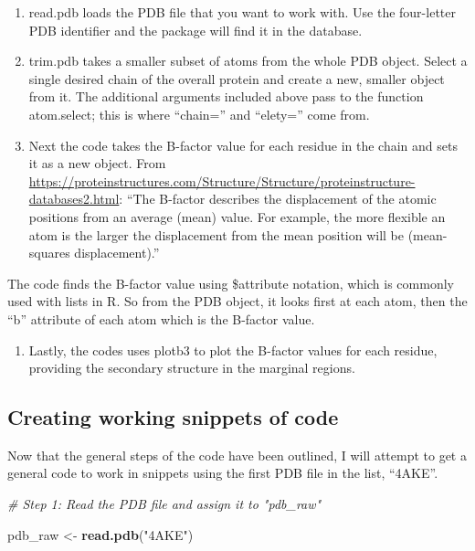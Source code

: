 \documentclass[]{article}
\newenvironment{Shaded}{\begin{snugshade}}{\end{snugshade}}
\newcommand{\KeywordTok}[1]{\textcolor[rgb]{0.13,0.29,0.53}{\textbf{{#1}}}}
\newcommand{\StringTok}[1]{\textcolor[rgb]{0.31,0.60,0.02}{{#1}}}
\newcommand{\CommentTok}[1]{\textcolor[rgb]{0.56,0.35,0.01}{\textit{{#1}}}}
\newcommand{\NormalTok}[1]{{#1}}
\providecommand{\tightlist}{%
  \setlength{\itemsep}{0pt}\setlength{\parskip}{0pt}}
\begin{document}
\begin{enumerate}
\def\labelenumi{\arabic{enumi}.}
\item
  read.pdb loads the PDB file that you want to work with. Use the
  four-letter PDB identifier and the package will find it in the
  database.
\item
  trim.pdb takes a smaller subset of atoms from the whole PDB object.
  Select a single desired chain of the overall protein and create a new,
  smaller object from it. The additional arguments included above pass
  to the function atom.select; this is where ``chain='' and ``elety=''
  come from.
\item
  Next the code takes the B-factor value for each residue in the chain
  and sets it as a new object. From
  \url{https://proteinstructures.com/Structure/Structure/proteinstructure-databases2.html}:
  ``The B-factor describes the displacement of the atomic positions from
  an average (mean) value. For example, the more flexible an atom is the
  larger the displacement from the mean position will be (mean-squares
  displacement).''
\end{enumerate}

The code finds the B-factor value using \$attribute notation, which is
commonly used with lists in R. So from the PDB object, it looks first at
each atom, then the ``b'' attribute of each atom which is the B-factor
value.

\begin{enumerate}
\def\labelenumi{\arabic{enumi}.}
\setcounter{enumi}{3}
\tightlist
\item
  Lastly, the codes uses plotb3 to plot the B-factor values for each
  residue, providing the secondary structure in the marginal regions.
\end{enumerate}

\subsection{Creating working snippets of
code}\label{creating-working-snippets-of-code}

Now that the general steps of the code have been outlined, I will
attempt to get a general code to work in snippets using the first PDB
file in the list, ``4AKE''.

\begin{Shaded}
\begin{Highlighting}[]
\CommentTok{# Step 1: Read the PDB file and assign it to "pdb_raw"}

\NormalTok{pdb_raw <-}\StringTok{ }\KeywordTok{read.pdb}\NormalTok{(}\StringTok{"4AKE"}\NormalTok{)}
\end{Highlighting}
\end{Shaded}
\end{document}

